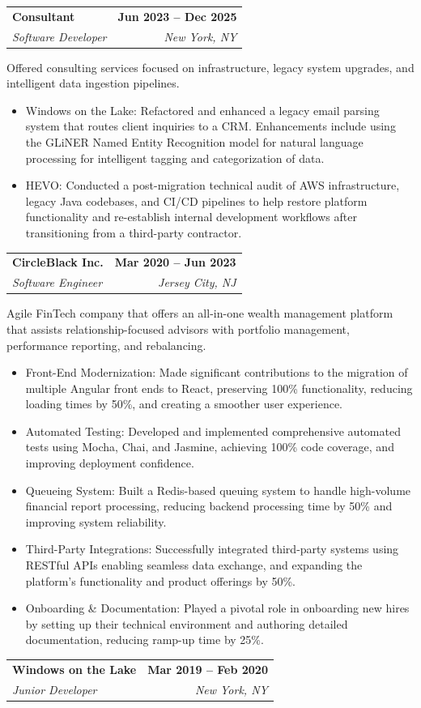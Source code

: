 \documentclass[letterpaper,11pt]{article}
\makeatletter
\newcommand{\resumeItem}[1]{
  \item\small{
    {#1 \vspace{-2pt}}
  }
}
\newcommand{\resumeSubheading}[4]{
  \vspace{-2pt}\item
    \begin{tabular*}{1.0\textwidth}[t]{l@{\extracolsep{\fill}}r}
      \textbf{#1} & \textbf{\small #2} \\
      \textit{\small#3} & \textit{\small #4} \\
    \end{tabular*}\vspace{-7pt}
}
\newcommand{\resumeItemListStart}{\begin{itemize}}
\newcommand{\resumeItemListEnd}{\end{itemize}\vspace{-5pt}}
\makeatother
\begin{document}
    \resumeSubheading
      {Consultant}{Jun 2023 -- Dec 2025}
      {Software Developer}{New York, NY}

      Offered consulting services focused on infrastructure, legacy system upgrades, and intelligent data ingestion pipelines.
      \resumeItemListStart
        \resumeItem{Windows on the Lake: Refactored and enhanced a legacy email parsing system that routes client inquiries to a CRM. Enhancements include using the GLiNER Named Entity Recognition model for natural language processing for intelligent tagging and categorization of data.}
        \resumeItem{HEVO: Conducted a post-migration technical audit of AWS infrastructure, legacy Java codebases, and CI/CD pipelines to help restore platform functionality and re-establish internal development workflows after transitioning from a third-party contractor.}
      \resumeItemListEnd

    \resumeSubheading
      {CircleBlack Inc.}{Mar 2020 -- Jun 2023}
      {Software Engineer}{Jersey City, NJ}

      Agile FinTech company that offers an all-in-one wealth management platform that assists relationship-focused advisors with portfolio management, performance reporting, and rebalancing.
      \resumeItemListStart
        \resumeItem{Front-End Modernization: Made significant contributions to the migration of multiple Angular front ends to React, preserving 100\% functionality, reducing loading times by 50\%, and creating a smoother user experience.}
        \resumeItem{Automated Testing: Developed and implemented comprehensive automated tests using Mocha, Chai, and Jasmine, achieving 100\% code coverage, and improving deployment confidence.}
        \resumeItem{Queueing System: Built a Redis-based queuing system to handle high-volume financial report processing, reducing backend processing time by 50\% and improving system reliability.}
        \resumeItem{Third-Party Integrations: Successfully integrated third-party systems using RESTful APIs enabling seamless data exchange, and expanding the platform's functionality and product offerings by 50\%.}
        \resumeItem{Onboarding \& Documentation: Played a pivotal role in onboarding new hires by setting up their technical environment and authoring detailed documentation, reducing ramp-up time by 25\%.}
      \resumeItemListEnd

    \resumeSubheading
      {Windows on the Lake}{Mar 2019 -- Feb 2020}
      {Junior Developer}{New York, NY}
\end{document}
